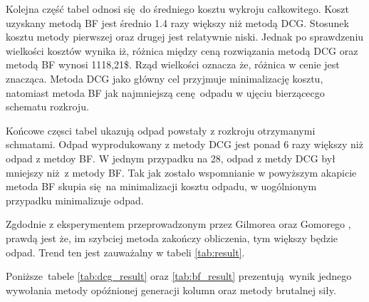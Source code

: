 Kolejna część tabel odnosi się do średniego kosztu wykroju całkowitego. Koszt uzyskany metodą BF jest średnio 1.4 razy większy niż metodą DCG. Stosunek kosztu metody pierwszej oraz drugej jest relatywnie niski. Jednak po sprawdzeniu wielkości kosztów wynika iż, różnica między ceną rozwiązania metodą DCG oraz metodą BF wynosi 1118,21\$. Rząd wielkości oznacza że, różnica w cenie jest znacząca. Metoda DCG jako główny cel przyjmuje minimalizację kosztu, natomiast metoda BF jak najmniejszą cenę odpadu w ujęciu bierzącecgo schematu rozkroju.

Końcowe częsci tabel ukazują odpad powstały z rozkroju otrzymanymi schmatami. Odpad wyprodukowany z metody DCG jest ponad 6 razy większy niż odpad z metdoy BF. W jednym przypadku na 28, odpad z metdy DCG był mniejszy niż z metody BF. Tak jak zostało wspomnianie w powyższym akapicie metoda BF skupia się na minimalizacji kosztu odpadu, w uogólnionym przypadku minimalizuje odpad.   

Zgdodnie z eksperymentem przeprowadzonym przez Gilmorea oraz Gomorego \cite{GilmoreGomoryV2Article}, prawdą jest że, im szybciej metoda zakończy obliczenia, tym większy będzie odpad. Trend ten jest zauważalny w tabeli \ref{tab:result}.

Poniższe tabele \ref{tab:dcg_result} oraz \ref{tab:bf_result} prezentują wynik jednego wywołania metody opóźnionej generacji kolumn oraz metody brutalnej siły.

